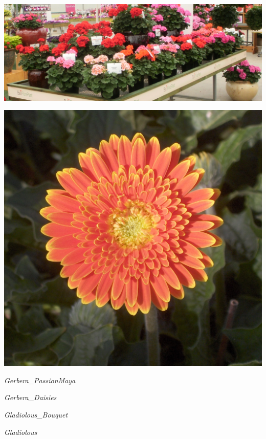 \documentclass{article}
\begin{document}
\begin{center}
\includegraphics[height=0.9\textheight, angle=90]{../Geranium.jpg}
\end{center}
\newpage

\begin{center}
\includegraphics[height=0.9\textheight, angle=90]{../Gerbera.jpg}
\end{center}
\newpage

\noindent
\vfill
\centerline{{\Large\emph{Gerbera_PassionMaya}}}
\vfill
\newpage

\noindent
\vfill
\centerline{{\Large\emph{Gerbera_Daisies}}}
\vfill
\newpage

\noindent
\vfill
\centerline{{\Large\emph{Gladiolous_Bouquet}}}
\vfill
\newpage

\noindent
\vfill
\centerline{{\Large\emph{Gladiolous}}}
\vfill
\newpage
\end{document}
